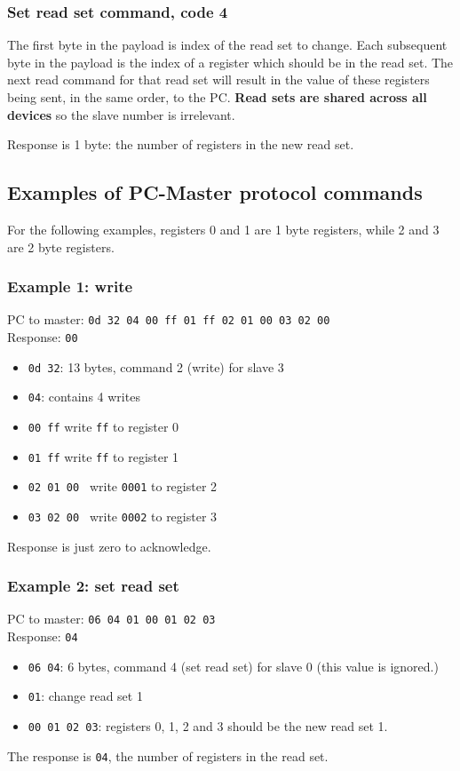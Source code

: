 \subsubsection{Set read set command, code 4}
The first byte in the payload is index of the read set to change. 
Each subsequent byte in the payload is the index of a register
which should be in the read set. The next read command for that read set
will result in the value of these registers being sent,
in the same order, to the PC. \textbf{Read sets are shared across all devices}
so the slave number is irrelevant.

Response is 1 byte: the number of registers in the new read
set.

\clearpage
\subsection{Examples of PC-Master protocol commands}
For the following examples, registers 0 and 1 are 1 byte
registers, while 2 and 3 are 2 byte registers.

\subsubsection{Example 1: write}
PC to master: \verb+0d 32 04 00 ff 01 ff 02 01 00 03 02 00+ \\
Response: \verb+00+ 
\begin{itemize}
\item \verb+0d 32+:  13 bytes, command 2 (write) for slave 3
\item \verb+04+: contains 4 writes
\item \verb+00 ff+ write \verb+ff+ to register 0
\item \verb+01 ff+ write \verb+ff+ to register 1
\item \verb+02 01 00 + write \verb+0001+ to register 2
\item \verb+03 02 00 + write \verb+0002+ to register 3
\end{itemize}
Response is just zero to acknowledge.

\subsubsection{Example 2: set read set}
PC to master: \verb+06 04 01 00 01 02 03+ \\
Response: \verb+04+ 
\begin{itemize}
\item \verb+06 04+: 6 bytes, command 4 (set read set) for slave 0 (this value is ignored.)
\item \verb+01+: change read set 1
\item \verb+00 01 02 03+: registers 0, 1, 2 and 3 should be the new read set 1.
\end{itemize}
The response is \verb+04+, the number of registers in the read set.


